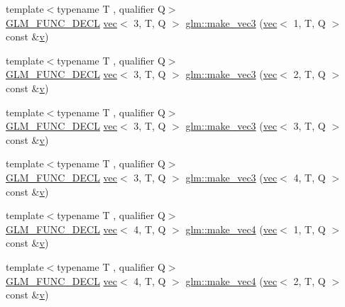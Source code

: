 \begin{DoxyCompactItemize}
{\footnotesize template$<$typename T , qualifier Q$>$ }\\\hyperlink{setup_8hpp_ab2d052de21a70539923e9bcbf6e83a51}{G\+L\+M\+\_\+\+F\+U\+N\+C\+\_\+\+D\+E\+CL} \hyperlink{structglm_1_1vec}{vec}$<$ 3, T, Q $>$ \hyperlink{group__gtc__type__ptr_ga9147e4b3a5d0f4772edfbfd179d7ea0b}{glm\+::make\+\_\+vec3} (\hyperlink{structglm_1_1vec}{vec}$<$ 1, T, Q $>$ const \&\hyperlink{_s_d_l__opengl_8h_a10a82eabcb59d2fcd74acee063775f90}{v})
\item 
{\footnotesize template$<$typename T , qualifier Q$>$ }\\\hyperlink{setup_8hpp_ab2d052de21a70539923e9bcbf6e83a51}{G\+L\+M\+\_\+\+F\+U\+N\+C\+\_\+\+D\+E\+CL} \hyperlink{structglm_1_1vec}{vec}$<$ 3, T, Q $>$ \hyperlink{group__gtc__type__ptr_ga482b60a842a5b154d3eed392417a9511}{glm\+::make\+\_\+vec3} (\hyperlink{structglm_1_1vec}{vec}$<$ 2, T, Q $>$ const \&\hyperlink{_s_d_l__opengl_8h_a10a82eabcb59d2fcd74acee063775f90}{v})
\item 
{\footnotesize template$<$typename T , qualifier Q$>$ }\\\hyperlink{setup_8hpp_ab2d052de21a70539923e9bcbf6e83a51}{G\+L\+M\+\_\+\+F\+U\+N\+C\+\_\+\+D\+E\+CL} \hyperlink{structglm_1_1vec}{vec}$<$ 3, T, Q $>$ \hyperlink{group__gtc__type__ptr_gacd57046034df557b8b1c457f58613623}{glm\+::make\+\_\+vec3} (\hyperlink{structglm_1_1vec}{vec}$<$ 3, T, Q $>$ const \&\hyperlink{_s_d_l__opengl_8h_a10a82eabcb59d2fcd74acee063775f90}{v})
\item 
{\footnotesize template$<$typename T , qualifier Q$>$ }\\\hyperlink{setup_8hpp_ab2d052de21a70539923e9bcbf6e83a51}{G\+L\+M\+\_\+\+F\+U\+N\+C\+\_\+\+D\+E\+CL} \hyperlink{structglm_1_1vec}{vec}$<$ 3, T, Q $>$ \hyperlink{group__gtc__type__ptr_ga8b589ed7d41a298b516d2a69169248f1}{glm\+::make\+\_\+vec3} (\hyperlink{structglm_1_1vec}{vec}$<$ 4, T, Q $>$ const \&\hyperlink{_s_d_l__opengl_8h_a10a82eabcb59d2fcd74acee063775f90}{v})
\item 
{\footnotesize template$<$typename T , qualifier Q$>$ }\\\hyperlink{setup_8hpp_ab2d052de21a70539923e9bcbf6e83a51}{G\+L\+M\+\_\+\+F\+U\+N\+C\+\_\+\+D\+E\+CL} \hyperlink{structglm_1_1vec}{vec}$<$ 4, T, Q $>$ \hyperlink{group__gtc__type__ptr_ga600cb97f70c5d50d3a4a145e1cafbf37}{glm\+::make\+\_\+vec4} (\hyperlink{structglm_1_1vec}{vec}$<$ 1, T, Q $>$ const \&\hyperlink{_s_d_l__opengl_8h_a10a82eabcb59d2fcd74acee063775f90}{v})
\item 
{\footnotesize template$<$typename T , qualifier Q$>$ }\\\hyperlink{setup_8hpp_ab2d052de21a70539923e9bcbf6e83a51}{G\+L\+M\+\_\+\+F\+U\+N\+C\+\_\+\+D\+E\+CL} \hyperlink{structglm_1_1vec}{vec}$<$ 4, T, Q $>$ \hyperlink{group__gtc__type__ptr_gaa9bd116caf28196fd1cf00b278286fa7}{glm\+::make\+\_\+vec4} (\hyperlink{structglm_1_1vec}{vec}$<$ 2, T, Q $>$ const \&\hyperlink{_s_d_l__opengl_8h_a10a82eabcb59d2fcd74acee063775f90}{v})

\end{DoxyCompactItemize}
